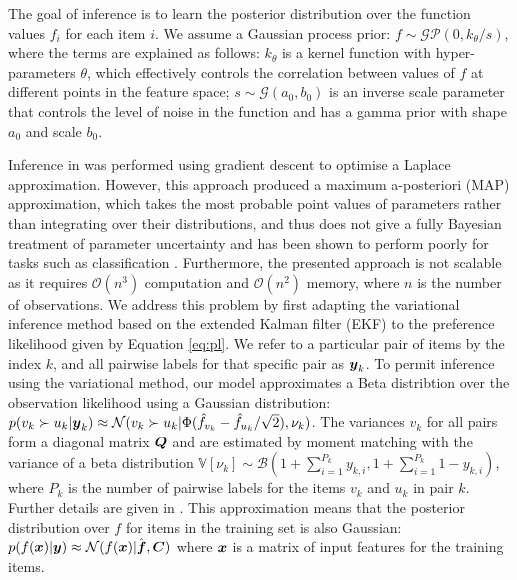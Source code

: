 
The goal of inference is to learn the posterior distribution over the function values $f_i$ for each item $i$.
We assume a Gaussian process prior: $f \sim \mathcal{GP}(0, k_{\theta}/s)$, where the terms are explained as follows: $k_{\theta}$ is a kernel function with hyper-parameters $\theta$, which effectively controls the correlation between values of $f$ at different points in the feature space; $s \sim \mathcal{G}(a_0, b_0)$ is an inverse scale parameter that controls the level of noise in the function and has a gamma prior with shape $a_0$ and scale $b_0$.

Inference in \cite{chu2005preference} was performed using gradient descent to optimise a Laplace approximation. However, this approach produced a maximum a-posteriori (MAP) approximation, which takes the most probable point values of parameters rather than integrating over their distributions, and thus does not give a fully Bayesian treatment of parameter uncertainty and has been shown to perform poorly for tasks such as classification \cite{nickisch2008approximations}. Furthermore, the presented approach is not scalable as it requires
$\mathcal{O}(n^3)$ computation and $\mathcal{O}(n^2)$ memory, 
where $n$ is the number of observations. 
We address this problem by first adapting the variational inference method 
based on the extended Kalman filter (EKF) \cite{reece2011determining,steinberg2014extended} 
to the preference likelihood given by Equation \ref{eq:pl}.
We refer to a particular pair of items by the index $k$, and all pairwise labels for that specific pair as $\boldsymbol y_k$.
To permit inference using the variational method, our model approximates
a Beta distribtion over the observation likelihood using a Gaussian distribution:
$p( v_k \succ u_k | \boldsymbol y_k ) \approx \mathcal{N}( v_k \succ u_k | \Phi(\hat{f}_{v_k} - \hat{f}_{u_k}/\sqrt 2), \nu_{k})$. 
The variances $v_k$ for all pairs form a diagonal matrix $\boldsymbol Q$ and are estimated by moment matching with 
the variance of a beta distribution $\mathbb{V}[\nu_k] \sim \mathcal{B}(1 + \sum_{i=1}^{P_k} y_{k,i}, 1 + \sum_{i=1}^{P_k} 1 - y_{k,i})$, where $P_k$ is the number of pairwise labels for the items $v_k$ and $u_k$ in pair $k$.
Further details are given in \cite{reece2011determining}. %
This approximation means that the posterior distribution over $f$ for items in the training set
is also Gaussian: $p(f(\boldsymbol x) | \boldsymbol y) \approx \mathcal{N}(f(\boldsymbol x) | \hat{\boldsymbol f}, \boldsymbol C )$
where $\boldsymbol x$ is a matrix of input features for the training items. 

